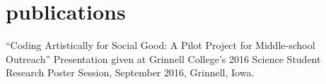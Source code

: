 \documentclass[]{friggeri-cv}
\begin{document}
%
%
\section{publications}

``Coding Artistically for Social Good: A Pilot Project for Middle-school Outreach''
        Presentation given at Grinnell College's 2016 Science Student Research Poster Session,
        September 2016, Grinnell, Iowa.

% 
\end{document}
